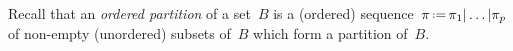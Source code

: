 \documentclass{amsart}
\theoremstyle{definition}
\newtheorem{definition}[theorem]{Definition}
\newcommand{\ssm}{\smallsetminus} %
\newcommand{\eqdef}{\mbox{\,\raisebox{0.2ex}{\scriptsize\ensuremath{\mathrm:}}\ensuremath{=}\,}} %
\newcommand{\darkblue}{\color{darkblue}} %
\newcommand{\defn}[1]{\textsl{\darkblue #1}} %
\newcommand{\vincent}[1]{\todo[color=blue!30]{#1 \\ \hfill --- V.}}
\begin{document}
Recall that an \defn{ordered partition} of a set~$B$ is a (ordered) sequence~$\pi \eqdef \pi_1 | \dots | \pi_p$ of non-empty (unordered) subsets of~$B$ which form a partition of~$B$.

\end{document}
